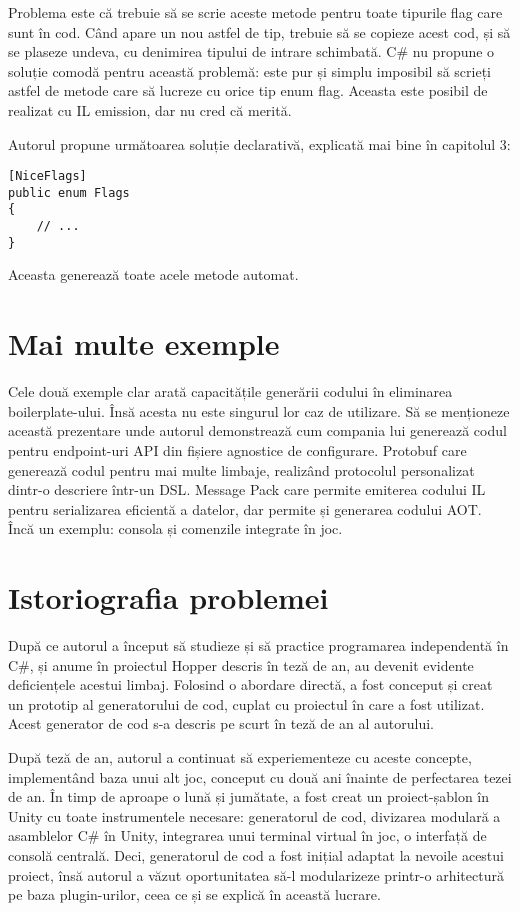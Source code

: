 \documentclass[a4paper,12pt]{report}
\begin{document}
Problema este că trebuie să se scrie aceste metode pentru toate tipurile flag care sunt în cod.
Când apare un nou astfel de tip, trebuie să se copieze acest cod, și să se plaseze undeva, cu denimirea tipului de intrare schimbată.
C\# nu propune o soluție comodă pentru această problemă: este pur și simplu imposibil să scrieți astfel de metode care să lucreze cu orice tip enum flag.
Aceasta este posibil de realizat cu IL emission, dar nu cred că merită.

Autorul propune următoarea soluție declarativă, explicată mai bine în capitolul 3:

\begin{verbatim}
[NiceFlags]
public enum Flags
{
    // ...
}
\end{verbatim}

Aceasta generează toate acele metode automat.

\section{Mai multe exemple}

Cele două exemple clar arată capacitățile generării codului în eliminarea boilerplate-ului.
Însă acesta nu este singurul lor caz de utilizare.
Să se menționeze această prezentare\cite{microservices_code_generation} unde autorul demonstrează cum compania lui generează codul pentru endpoint-uri \ac{API} din fișiere agnostice de configurare.
Protobuf\cite{protobuf} care generează codul pentru mai multe limbaje, realizând protocolul personalizat dintr-o descriere într-un \ac{DSL}.
Message Pack\cite{message_pack_github} care permite emiterea codului IL pentru serializarea eficientă a datelor, dar permite și generarea codului \ac{AOT}.
Încă un exemplu: consola și comenzile integrate în joc\cite{command_terminal}.


\section{Istoriografia problemei}

După ce autorul a început să studieze și să practice programarea independentă în C\#, și anume în proiectul Hopper descris în teză de an, au devenit evidente deficiențele acestui limbaj.
Folosind o abordare directă, a fost conceput și creat un prototip al generatorului de cod, cuplat cu proiectul în care a fost utilizat.
Acest generator de cod s-a descris pe scurt în teză de an al autorului.

După teză de an, autorul a continuat să experiementeze cu aceste concepte, implementând baza unui alt joc, conceput cu două ani înainte de perfectarea tezei de an.
În timp de aproape o lună și jumătate, a fost creat un proiect-șablon în Unity cu toate instrumentele necesare: generatorul de cod, divizarea modulară a asamblelor C\# în Unity, integrarea unui terminal virtual în joc, o interfață de consolă centrală\cite{particular_project}.
Deci, generatorul de cod a fost inițial adaptat la nevoile acestui proiect, însă autorul a văzut oportunitatea să-l modularizeze printr-o arhitectură pe baza plugin-urilor, ceea ce și se explică în această lucrare.
\end{document}
